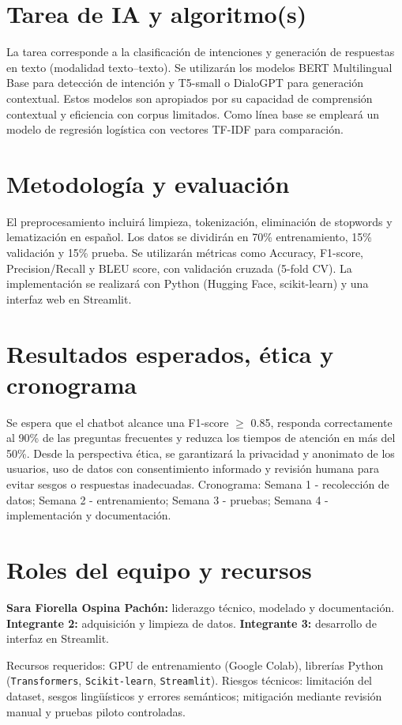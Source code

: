 \documentclass[11pt,letterpaper]{article}
\begin{document}
\section*{Tarea de IA y algoritmo(s)}
La tarea corresponde a la clasificación de intenciones y generación de respuestas en texto (modalidad texto–texto). Se utilizarán los modelos BERT Multilingual Base para detección de intención y T5-small o DialoGPT para generación contextual. Estos modelos son apropiados por su capacidad de comprensión contextual y eficiencia con corpus limitados. Como línea base se empleará un modelo de regresión logística con vectores TF-IDF para comparación.

\section*{Metodología y evaluación}
El preprocesamiento incluirá limpieza, tokenización, eliminación de stopwords y lematización en español. Los datos se dividirán en 70\% entrenamiento, 15\% validación y 15\% prueba. Se utilizarán métricas como Accuracy, F1-score, Precision/Recall y BLEU score, con validación cruzada (5-fold CV). La implementación se realizará con Python (Hugging Face, scikit-learn) y una interfaz web en Streamlit.

\section*{Resultados esperados, ética y cronograma}
Se espera que el chatbot alcance una F1-score $\geq$ 0.85, responda correctamente al 90\% de las preguntas frecuentes y reduzca los tiempos de atención en más del 50\%. Desde la perspectiva ética, se garantizará la privacidad y anonimato de los usuarios, uso de datos con consentimiento informado y revisión humana para evitar sesgos o respuestas inadecuadas. Cronograma: Semana 1 - recolección de datos; Semana 2 - entrenamiento; Semana 3 - pruebas; Semana 4 - implementación y documentación.

\section*{Roles del equipo y recursos}
\textbf{Sara Fiorella Ospina Pachón:} liderazgo técnico, modelado y documentación.  
\textbf{Integrante 2:} adquisición y limpieza de datos.  
\textbf{Integrante 3:} desarrollo de interfaz en Streamlit.  

Recursos requeridos: GPU de entrenamiento (Google Colab), librerías Python (\texttt{Transformers}, \texttt{Scikit-learn}, \texttt{Streamlit}).  
Riesgos técnicos: limitación del dataset, sesgos lingüísticos y errores semánticos; mitigación mediante revisión manual y pruebas piloto controladas.
\end{document}
